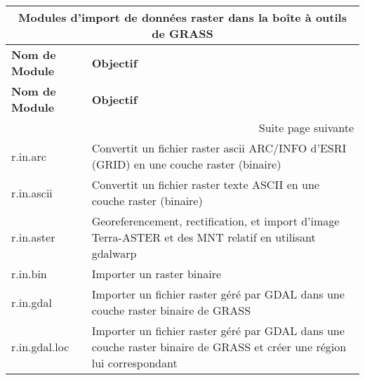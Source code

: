 \begin{center}
{\setlength{\extrarowheight}{10pt}
\small
\begin{longtable}{|p{2.5cm}|p{11.5cm}|}
  \hline \multicolumn{2}{|c|}{\textbf{Modules d'import de données raster dans la boîte à outils de GRASS}} \\ 
\hline \textbf{Nom de Module}&\textbf{Objectif}\\
\endfirsthead
\hline \textbf{Nom de Module}&\textbf{Objectif}\\
\endhead
\hline \multicolumn{2}{|r|}{{Suite page suivante}} \\ \hline
\endfoot
\endlastfoot
   \hline r.in.arc & Convertit un fichier raster ascii ARC/INFO d'ESRI (GRID) en une couche raster (binaire) \\
  \hline r.in.ascii & Convertit un fichier raster texte ASCII en une couche raster (binaire)\\
  \hline r.in.aster & Georeferencement, rectification, et import d'image Terra-ASTER et des MNT relatif en utilisant gdalwarp \\
   \hline r.in.bin & Importer un raster binaire \\
   \hline r.in.gdal &  Importer un fichier raster géré par GDAL dans une couche raster binaire de GRASS\\
  \hline r.in.gdal.loc &  Importer un fichier raster géré par GDAL dans une couche raster binaire de GRASS et créer une région lui correspondant\\

\end{longtable}}
\end{center}
